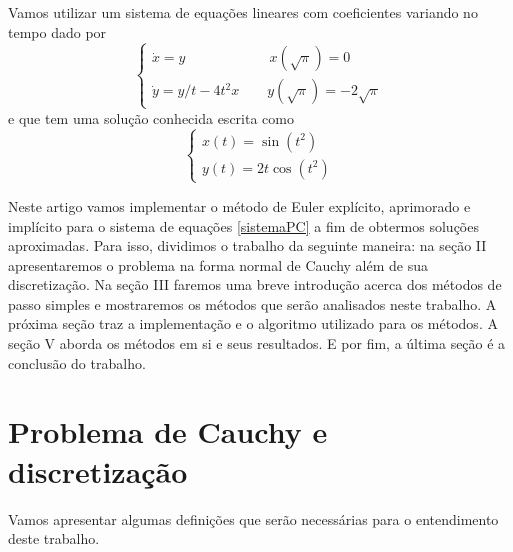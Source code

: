 \documentclass[amsmath,amssymb,floatfix]{revtex4}
\begin{document}
Vamos utilizar um sistema de equações lineares com coeficientes variando no tempo dado por
\begin{equation}\label{sistemaPC}
\begin{cases}
\dot x=y  \qquad \qquad \qquad x(\sqrt{\pi}) = 0 \\
\dot y=y/t - 4t^2x \qquad y(\sqrt{\pi}) = -2\sqrt{\pi}
\end{cases}
\end{equation}
e que tem uma solução conhecida escrita como 
\begin{equation}\label{sol_exata}
\begin{cases}
 x(t)= \sin(t^2) \\ 
 y(t)= 2t\cos(t^2)
\end{cases}
\end{equation}

Neste artigo vamos implementar o método de Euler explícito, aprimorado e implícito para o sistema de equações \eqref{sistemaPC} a fim de obtermos soluções aproximadas. Para isso, dividimos o trabalho da seguinte maneira: na seção II apresentaremos o problema na forma normal de Cauchy além de sua discretização. Na seção III faremos uma breve introdução acerca dos métodos de passo simples e mostraremos os métodos que serão analisados neste trabalho. A próxima seção traz a implementação e o algoritmo utilizado para os métodos. A seção V aborda os métodos em si e seus resultados. E por fim, a última seção é a conclusão do trabalho.  

\section{Problema de Cauchy e discretização}
Vamos apresentar algumas definições que serão necessárias para o entendimento deste trabalho. 
\end{document}
